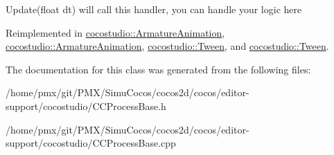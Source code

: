 Update(float dt) will call this handler, you can handle your logic here 

Reimplemented in \hyperlink{classcocostudio_1_1ArmatureAnimation_ae2fd5441c69b5ac036116bbe548f5595}{cocostudio\+::\+Armature\+Animation}, \hyperlink{classcocostudio_1_1ArmatureAnimation_ae2fd5441c69b5ac036116bbe548f5595}{cocostudio\+::\+Armature\+Animation}, \hyperlink{classcocostudio_1_1Tween_ac595b653e11b8548f9ce599c0bc79f08}{cocostudio\+::\+Tween}, and \hyperlink{classcocostudio_1_1Tween_a35d383d868e393dc518c1197fc3a00ff}{cocostudio\+::\+Tween}.



The documentation for this class was generated from the following files\+:\begin{DoxyCompactItemize}
\item 
/home/pmx/git/\+P\+M\+X/\+Simu\+Cocos/cocos2d/cocos/editor-\/support/cocostudio/C\+C\+Process\+Base.\+h\item 
/home/pmx/git/\+P\+M\+X/\+Simu\+Cocos/cocos2d/cocos/editor-\/support/cocostudio/C\+C\+Process\+Base.\+cpp\end{DoxyCompactItemize}
